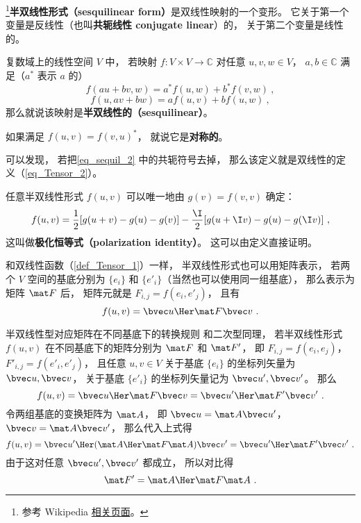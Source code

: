 
\begin{issues}
\issueDraft
\end{issues}

\footnote{参考 Wikipedia \href{https://en.wikipedia.org/wiki/Sesquilinear_form}{相关页面}。}\textbf{半双线性形式（sesquilinear form）}是双线性映射的一个变形。 它关于第一个变量是反线性（也叫\textbf{共轭线性 conjugate linear}）的， 关于第二个变量是线性的。
\begin{definition}{}\label{def_sequil_1}
复数域上的线性空间 $V$ 中， 若映射 $f:V\times V\to \mathbb C$ 对任意 $u, v, w\in V$， $a,b\in \mathbb C$ 满足（$a^*$ 表示 $a$ 的）
\begin{equation}\label{eq_sequil_2}
f(au+bv, w) = a^*f(u, w) + b^*f(v, w)~,
\end{equation}
\begin{equation}\label{eq_sequil_1}
f(u, av+bw) = af(u, v) + bf(u, w)~,
\end{equation}
那么就说该映射是\textbf{半双线性的（sesquilinear）}。
\end{definition}
如果满足 $f(u, v) = f(v, u)^*$， 就说它是\textbf{对称的}。

可以发现， 若把\autoref{eq_sequil_2} 中的共轭符号去掉， 那么该定义就是双线性的定义（\autoref{eq_Tensor_2}）。

任意半双线性形式 $f(u, v)$ 可以唯一地由 $g(v) = f(v, v)$ 确定：
\begin{equation}
f(u, v) =\frac{1}{2}[g(u+v)-g(u)-g(v)]
-\frac{\I}{2}[g(u+\I v)-g(u)-g(\I v)]~,
\end{equation}
这叫做\textbf{极化恒等式（polarization identity）}。 这可以由定义直接证明。

和双线性函数（\autoref{def_Tensor_1}）一样， 半双线性形式也可以用矩阵表示， 若两个 $V$ 空间的基底分别为 $\{e_i\}$ 和 $\{e'_i\}$（当然也可以使用同一组基底）， 那么表示为矩阵 $\mat F$ 后， 矩阵元就是 $F_{i,j} = f(e_i, e'_j)$， 且有
\begin{equation}
f(u, v) = \bvec u\Her \mat F \bvec v~.
\end{equation}

\begin{example}{半双线性型对应矩阵在不同基底下的转换规则}\label{ex_sequil_1}
和二次型同理， 若半双线性形式 $f(u, v)$ 在不同基底下的矩阵分别为 $\mat F$ 和 $\mat F'$， 即 $F_{i,j} = f(e_i, e_j)$， $F'_{i,j} = f(e'_i, e'_j)$， 且任意 $u, v\in V$ 关于基底 $\{e_i\}$ 的坐标列矢量为 $\bvec u, \bvec v$， 关于基底 $\{e'_i\}$ 的坐标列矢量记为 $\bvec u', \bvec v'$。 那么
\begin{equation}
f(u, v) = \bvec u\Her \mat F \bvec v = {\bvec u'}\Her \mat F' \bvec v'~.
\end{equation}
令两组基底的变换矩阵为 $\mat A$， 即 $\bvec u = \mat A\bvec u'$， $\bvec v = \mat A \bvec v'$， 那么代入上式得
\begin{equation}
f(u, v) = {\bvec u'}\Her (\mat A\Her \mat F \mat A) \bvec v' = {\bvec u'}\Her \mat F' \bvec v'~.
\end{equation}
由于这对任意 $\bvec u', \bvec v'$ 都成立， 所以对比得
\begin{equation}
\mat F' = \mat A\Her \mat F \mat A~.
\end{equation}
\end{example}
